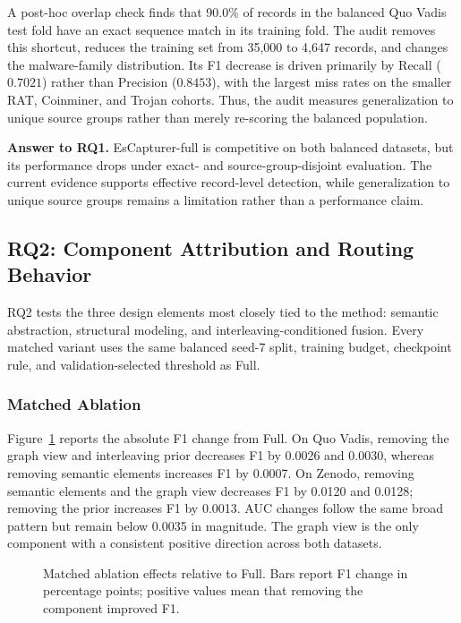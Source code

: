 A post-hoc overlap check finds that 90.0\% of records in the balanced Quo
Vadis test fold have an exact sequence match in its training fold.  The audit
removes this shortcut, reduces the training set from 35,000 to 4,647 records,
and changes the malware-family distribution.  Its F1 decrease is driven
primarily by Recall ($0.7021$) rather than Precision ($0.8453$), with the
largest miss rates on the smaller RAT, Coinminer, and Trojan cohorts.  Thus,
the audit measures generalization to unique source groups rather than merely
re-scoring the balanced population.

\noindent\textbf{Answer to RQ1.}
EsCapturer-full is competitive on both balanced datasets, but its performance
drops under exact- and source-group-disjoint evaluation.  The current evidence
supports effective record-level detection, while generalization to unique
source groups remains a limitation rather than a performance claim.

\subsection{RQ2: Component Attribution and Routing Behavior}
\label{sec:rq2}

RQ2 tests the three design elements most closely tied to the method:
semantic abstraction, structural modeling, and interleaving-conditioned
fusion.  Every matched variant uses the same balanced seed-7 split, training
budget, checkpoint rule, and validation-selected threshold as Full.

\subsubsection{Matched Ablation}
Figure~\ref{fig:rq2-ablation-delta} reports the absolute F1 change from Full.
On Quo Vadis, removing the graph view and interleaving prior decreases F1 by
0.0026 and 0.0030, whereas removing semantic elements increases F1 by 0.0007.
On Zenodo, removing semantic elements and the graph view decreases F1 by
0.0120 and 0.0128; removing the prior increases F1 by 0.0013.  AUC changes
follow the same broad pattern but remain below 0.0035 in magnitude.  The graph
view is the only component with a consistent positive direction across both
datasets.

\begin{figure}[!t]
\centering
{}
\caption{Matched ablation effects relative to Full.  Bars report F1 change in
percentage points; positive values mean that removing the component improved
F1.}
\label{fig:rq2-ablation-delta}
\end{figure}

